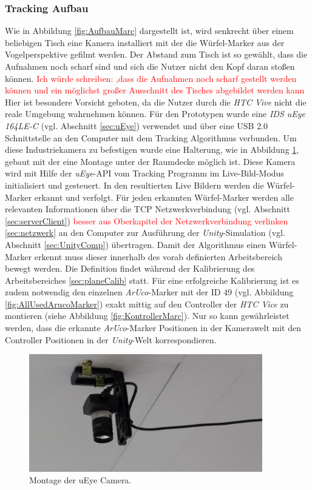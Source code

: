 \subsubsection{Tracking Aufbau}
Wie in Abbildung \ref{fig:AufbauMarc} dargestellt ist, wird senkrecht über einem beliebigen Tisch eine Kamera installiert mit der die Würfel-Marker aus der Vogelperspektive gefilmt werden. Der Abstand zum Tisch ist so gewählt, dass die Aufnahmen noch scharf sind und sich die Nutzer nicht den Kopf daran stoßen können. \textcolor{red}{Ich würde schreiben: ,dass die Aufnahmen noch scharf gestellt werden können und ein möglichst großer Ausschnitt des Tisches abgebildet werden kann} Hier ist besondere Vorsicht geboten, da die Nutzer durch die \textit{HTC Vive} nicht die reale Umgebung wahrnehmen können. Für den Prototypen wurde eine \textit{IDS uEye 164LE-C} (vgl. Abschnitt \ref{sec:uEye}) verwendet und über eine USB 2.0 Schnittstelle an den Computer mit dem Tracking Algorithmus verbunden. Um diese Industriekamera zu befestigen wurde eine Halterung, wie in Abbildung \ref{fig:uEyeMontage}, gebaut mit der eine Montage unter der Raumdecke möglich ist. Diese Kamera wird mit Hilfe der \textit{uEye}-API vom Tracking Programm im Live-Bild-Modus initialisiert und gesteuert. In den resultierten Live Bildern werden die Würfel-Marker erkannt und verfolgt. Für jeden erkannten Würfel-Marker werden alle relevanten Informationen über die TCP Netzwerkverbindung (vgl. Abschnitt \ref{sec:serverClient}) \textcolor{red}{besser aus Oberkapitel der Netzwerkverbindung verlinken \ref{sec:netzwerk}} an den Computer zur Ausführung der \textit{Unity}-Simulation (vgl. Abschnitt \ref{sec:UnityComp}) übertragen. Damit der Algorithmus einen Würfel-Marker erkennt muss dieser innerhalb des vorab definierten Arbeitsbereich bewegt werden. Die Definition findet während der Kalibrierung des Arbeitsbereiches \ref{sec:planeCalib} statt. Für eine erfolgreiche Kalibrierung ist es zudem notwendig den einzelnen \textit{ArUco}-Marker mit der ID $49$ (vgl. Abbildung \ref{fig:AllUsedArucoMarker}) exakt mittig auf den Controller der \textit{HTC Vice} zu montieren (siehe Abbildung \ref{fig:KontrollerMarc}). Nur so kann gewährleistet werden, dass die erkannte \textit{ArUco}-Marker Positionen in der Kamerawelt mit den Controller Positionen in der \textit{Unity}-Welt korrespondieren.

\begin{figure}[H]
	\centering
	\includegraphics[width=4in]{Bilder/Eigene Fotos/IMG_0020.jpg}			
	\caption{Montage der uEye Camera.}
	\label{fig:uEyeMontage}
\end{figure}

